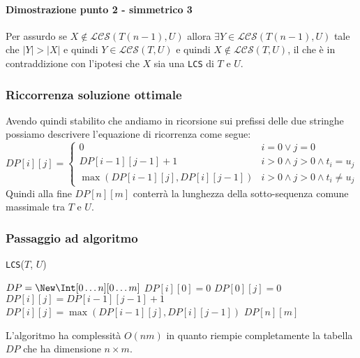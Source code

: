             \paragraph{Dimostrazione punto 2 - simmetrico 3}
                Per assurdo se $X\not\in\mathcal{LCS}(T(n-1),U)$ allora $\exists Y\in\mathcal{LCS}(T(n-1),U)$ tale che $|Y|>|X|$ e quindi $Y\in\mathcal{LCS}(T,U)$ e quindi $X\not\in\mathcal{LCS}(T,U)$, il che è in contraddizione con l'ipotesi che $X$ sia una \texttt{LCS} di $T$ e $U$.
        \subsubsection{Riccorrenza soluzione ottimale}
            Avendo quindi stabilito che andiamo in ricorsione sui prefissi delle due stringhe possiamo descrivere l'equazione di ricorrenza come segue:
            $$
                DP[i][j]=\begin{cases}
                    0 & i=0\lor j=0 \\
                    DP[i-1][j-1]+1 & i>0\land j>0\land t_i=u_j \\
                    \max(DP[i-1][j], DP[i][j-1]) & i>0\land j>0\land t_i\neq u_j
                \end{cases}
            $$
            Quindi alla fine $DP[n][m]$ conterrà la lunghezza della sotto-sequenza comune massimale tra $T$ e $U$.
        \subsubsection{Passaggio ad algoritmo}
            \begin{algorithm}[H]
                \caption{\Int \texttt{LCS}(\Item[] $T$, \Item[] $U$)}
                \begin{algorithmic}
                    \State \Int[][] $DP = \New \Int[0\dots n][0\dots m]$
                        \State $DP[i][0]=0$
                    \EndFor
                        \State $DP[0][j]=0$
                    \EndFor
                                \State $DP[i][j]=DP[i-1][j-1]+1$
                            \Else
                                \State $DP[i][j]=\max(DP[i-1][j], DP[i][j-1])$
                            \EndIf
                        \EndFor
                    \EndFor
                    \State \Return $DP[n][m]$
                \end{algorithmic}
            \end{algorithm}
            L'algoritmo ha complessità $O(nm)$ in quanto riempie completamente la tabella $DP$ che ha dimensione $n\times m$.
